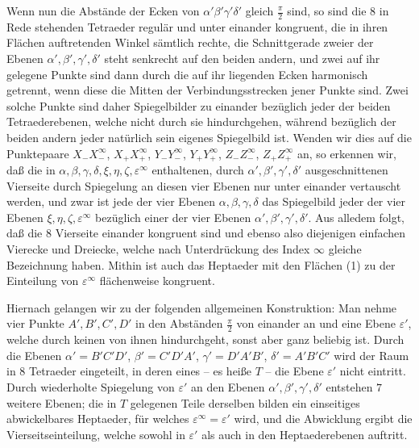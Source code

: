 \documentclass[11pt,a4paper]{article}
\begin{document}
Wenn nun die Abst\"ande der Ecken von $\alpha'\beta'\gamma'\delta'$ gleich $\frac{\pi}{2}$ sind, so sind die $8$ in Rede stehenden Tetraeder regul\"ar und unter einander kongruent, die in ihren Fl\"achen auftretenden Winkel s\"amtlich rechte, die Schnittgerade zweier der Ebenen $\alpha',\beta',\gamma',\delta'$ steht senkrecht auf den beiden andern, und zwei auf ihr gelegene Punkte sind dann durch die auf ihr liegenden Ecken harmonisch getrennt, wenn diese die Mitten der Verbindungsstrecken jener Punkte sind. Zwei solche Punkte sind daher Spiegelbilder zu einander bez\"uglich jeder der beiden Tetraederebenen, welche nicht durch sie hindurchgehen, w\"ahrend bez\"uglich der beiden andern jeder nat\"urlich sein eigenes Spiegelbild ist. Wenden wir dies auf die Punktepaare $X_-X_-^\infty$, $X_+X_+^\infty$, $Y_-Y_-^\infty$, $Y_+Y_+^\infty$, $Z_-Z_-^\infty$, $Z_+Z_+^\infty$ an, so erkennen wir, da\ss{} die in $\alpha,\beta,\gamma,\delta,\xi,\eta,\zeta,\varepsilon^\infty$ enthaltenen, durch $\alpha',\beta',\gamma',\delta'$ ausgeschnittenen Vierseite durch Spiegelung an diesen vier Ebenen nur unter einander vertauscht werden, und zwar ist jede der vier Ebenen $\alpha,\beta,\gamma,\delta$ das Spiegelbild jeder der vier Ebenen $\xi,\eta,\zeta,\varepsilon^\infty$ bez\"uglich einer der vier Ebenen $\alpha',\beta',\gamma',\delta'$. Aus alledem folgt, da\ss{} die $8$ Vierseite einander kongruent sind und ebenso also diejenigen einfachen Vierecke und Dreiecke, welche nach Unterdr\"uckung des Index $\infty$ gleiche Bezeichnung haben. Mithin ist auch das Heptaeder mit den Fl\"achen (1) zu der Einteilung von $\varepsilon^\infty$ fl\"achenweise kongruent.

Hiernach gelangen wir zu der folgenden allgemeinen Konstruktion: Man nehme vier Punkte $A',B',C',D'$ in den Abst\"anden $\frac{\pi}{2}$ von einander an und eine Ebene $\varepsilon'$, welche durch keinen von ihnen hindurchgeht, sonst aber ganz beliebig ist. Durch die Ebenen $\alpha'=B'C'D'$, $\beta'=C'D'A'$, $\gamma'=D'A'B'$, $\delta'=A'B'C'$ wird der Raum in $8$ Tetraeder eingeteilt, in deren eines -- es hei\ss{}e $T$ -- die Ebene $\varepsilon'$ nicht eintritt. Durch wiederholte Spiegelung von $\varepsilon'$ an den Ebenen $\alpha',\beta',\gamma',\delta'$ entstehen $7$ weitere Ebenen; die in $T$ gelegenen Teile derselben bilden ein einseitiges abwickelbares Heptaeder, f\"ur welches $\varepsilon^\infty=\varepsilon'$ wird, und die Abwicklung ergibt die Vierseitseinteilung, welche sowohl in $\varepsilon'$ als auch in den Heptaederebenen auftritt.
\end{document}
